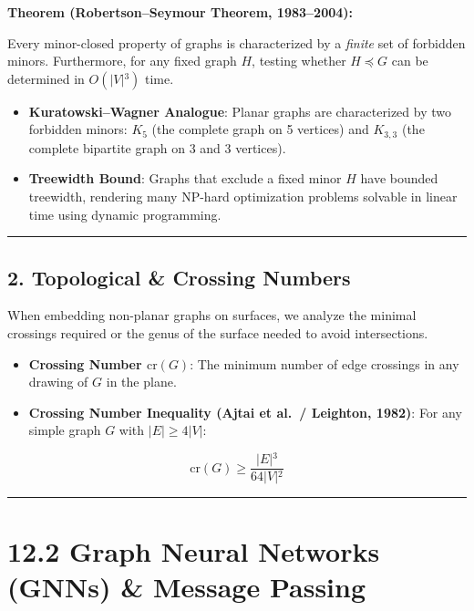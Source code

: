 \documentclass[
]{book}
\providecommand{\tightlist}{%
  \setlength{\itemsep}{0pt}\setlength{\parskip}{0pt}}
\theoremstyle{definition}
\theoremstyle{definition}
\theoremstyle{definition}
\theoremstyle{definition}
\theoremstyle{remark}
\begin{document}
\textbf{Theorem (Robertson--Seymour Theorem, 1983--2004):}

Every minor-closed property of graphs is characterized by a \emph{finite} set of forbidden minors. Furthermore, for any fixed graph \(H\), testing whether \(H \preceq G\) can be determined in \(O(\vert{}V\vert{}^3)\) time.

\begin{itemize}
\tightlist
\item
  \textbf{Kuratowski--Wagner Analogue}: Planar graphs are characterized by two forbidden minors: \(K_5\) (the complete graph on 5 vertices) and \(K_{3,3}\) (the complete bipartite graph on 3 and 3 vertices).
\item
  \textbf{Treewidth Bound}: Graphs that exclude a fixed minor \(H\) have bounded treewidth, rendering many NP-hard optimization problems solvable in linear time using dynamic programming.
\end{itemize}

\begin{center}\rule{0.5\linewidth}{0.5pt}\end{center}

\subsection{2. Topological \& Crossing Numbers}\label{topological-crossing-numbers}

When embedding non-planar graphs on surfaces, we analyze the minimal crossings required or the genus of the surface needed to avoid intersections.

\begin{itemize}
\tightlist
\item
  \textbf{Crossing Number \(\text{cr}(G)\)}: The minimum number of edge crossings in any drawing of \(G\) in the plane.
\item
  \textbf{Crossing Number Inequality (Ajtai et al.~/ Leighton, 1982)}:
  For any simple graph \(G\) with \(\vert{}E\vert{} \ge 4\vert{}V\vert{}\):
\end{itemize}

\[\text{cr}(G) \ge \frac{\vert{}E\vert{}^3}{64 \vert{}V\vert{}^2}\]

\begin{center}\rule{0.5\linewidth}{0.5pt}\end{center}

\section{12.2 Graph Neural Networks (GNNs) \& Message Passing}\label{graph-neural-networks-gnns-message-passing}
\end{document}
